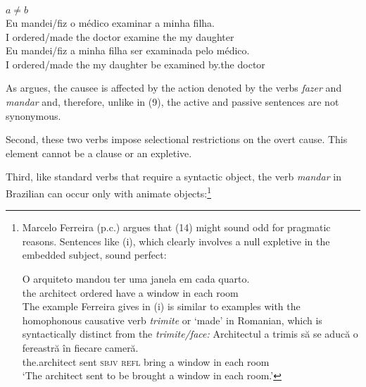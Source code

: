 \documentclass[output=paper]{langsci/langscibook}
\begin{document}
\ea%
           $a \neq b$\label{ex:moreno:10}\\
    \ea
    \gll Eu   mandei/fiz      o    médico   examinar  a    minha filha.\\
         I         ordered/made the doctor     examine    the my     daughter\\
    \ex  
    \gll Eu   mandei/fiz    a     minha filha      ser examinada pelo    médico.\\
         I         ordered/made the  my      daughter  be examined    by.the doctor\\
    \z
\z    

As \citet{Farrell1995} argues, the causee is affected by the action denoted by the verbs \textit{fazer} and \textit{mandar} and, therefore, unlike in (9), the active and passive sentences are not synonymous.

Second, these two verbs impose selectional restrictions on the overt cause. This element cannot be a clause or an expletive. 

    \z



\z

Third, like standard  verbs that require a syntactic object, the verb \textit{mandar} in Brazilian  can occur only with animate objects:\footnote{Marcelo Ferreira (p.c.) argues that (14) might sound odd for pragmatic reasons. Sentences like (i), which clearly involves a null expletive in the~ embedded subject, sound perfect:

\ea \gll  O   arquiteto mandou   ter    uma janela    em cada quarto.\\
the architect  ordered   have a      window in  each  room\\
\z The example Ferreira gives in (i) is similar to examples with the homophonous causative verb \textit{trimite} or ‘made’ in Romanian, which is syntactically distinct from the  \textit{trimite\slash face:}
\ea \gll Architectul   {a trimis} să     se    aducă       o fereastră în fiecare cameră.\\
         the.architect sent       \textsc{sbjv} \textsc{refl} bring a window   in each room\\
    \glt ‘The architect sent to be brought a window in each room.’
\z}
\end{document}
